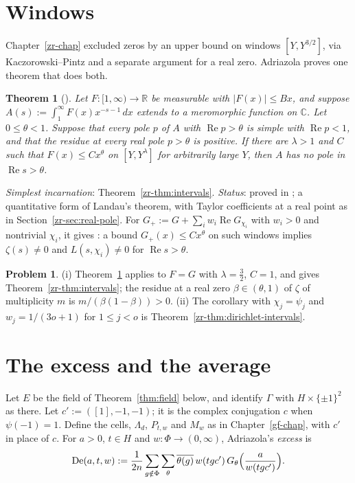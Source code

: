 \documentclass[reqno]{amsart}
\newcounter{chap}
\theoremstyle{definition}
\newtheorem{problem}{Problem}[section]
\theoremstyle{plain}
\newtheorem{theorem}{Theorem}[section]
\newcommand{\C}{\mathbb{C}}
\newcommand{\De}{\operatorname{De}}
\newcommand{\ol}{\overline}
\renewcommand{\Re}{\operatorname{Re}}
\begin{document}
\section{Windows}\label{sec:windows}

Chapter~\ref{zr-chap} excluded zeros by an upper bound on windows \([Y, Y^{3/2}]\), via Kaczorowski--Pintz and a separate argument for a real zero.  Adriazola proves one theorem that does both.

\begin{theorem}[{\cite[Thm.~2.4]{Adr}}]\label{thm:window}
Let \(F \colon [1,\infty) \to \mathbb{R}\) be measurable with \(\lvert F(x) \rvert \le Bx\), and suppose \(A(s) := \int_1^\infty F(x)x^{-s-1}\,dx\) extends to a meromorphic function on \(\C\).  Let \(0 \le \theta < 1\).  Suppose that every pole \(p\) of \(A\) with \(\Re p > \theta\) is simple with \(\Re p < 1\), and that the residue at every real pole \(p > \theta\) is positive.  If there are \(\lambda > 1\) and \(C\) such that \(F(x) \le Cx^\theta\) on \([Y, Y^\lambda]\) for arbitrarily large \(Y\), then \(A\) has no pole in \(\Re s > \theta\).
\end{theorem}

\noindent\emph{Simplest incarnation}: Theorem~\ref{zr-thm:intervals}.  \emph{Status}: proved in \cite{Adr}; a quantitative form of Landau's theorem, with Taylor coefficients at a real point as in Section~\ref{zr-sec:real-pole}.  For \(G_+ := G + \sum_i w_i\Re G_{\chi_i}\) with \(w_i > 0\) and nontrivial \(\chi_i\), it gives \cite[Cor.~2.5]{Adr}: a bound \(G_+(x) \le Cx^\theta\) on such windows implies \(\zeta(s) \ne 0\) and \(L(s,\chi_i) \ne 0\) for \(\Re s > \theta\).

\begin{problem}\label{pr:windows}
(i) Theorem~\ref{thm:window} applies to \(F = G\) with \(\lambda = \frac32\), \(C = 1\), and gives Theorem~\ref{zr-thm:intervals}; the residue at a real zero \(\beta \in (\theta, 1)\) of \(\zeta\) of multiplicity \(m\) is \(m/(\beta(1-\beta)) > 0\).
(ii) The corollary with \(\chi_j = \psi_j\) and \(w_j = 1/(3o+1)\) for \(1 \le j < o\) is Theorem~\ref{zr-thm:dirichlet-intervals}.
\end{problem}

\section{The excess and the average}\label{sec:average}

Let \(E\) be the field of Theorem~\ref{thm:field} below, and identify \(\Gamma\) with \(H \times \{\pm1\}^2\) as there.  Let \(c' := ([1], -1, -1)\); it is the complex conjugation \(c\) when \(\psi(-1) = 1\).  Define the cells, \(\Lambda_d\), \(P_{t,w}\) and \(M_w\) as in Chapter~\ref{gf-chap}, with \(c'\) in place of \(c\).  For \(a > 0\), \(t \in H\) and \(w \colon \Phi \to (0,\infty)\), Adriazola's \emph{excess} is
\[
  \De(a, t, w) := \frac{1}{2n}\sum_{g \notin \Phi}\sum_{\theta}\ol{\theta(g)}\, w(t g c')\, G_\theta\Bigl(\frac{a}{w(tgc')}\Bigr) .
\]
\end{document}

